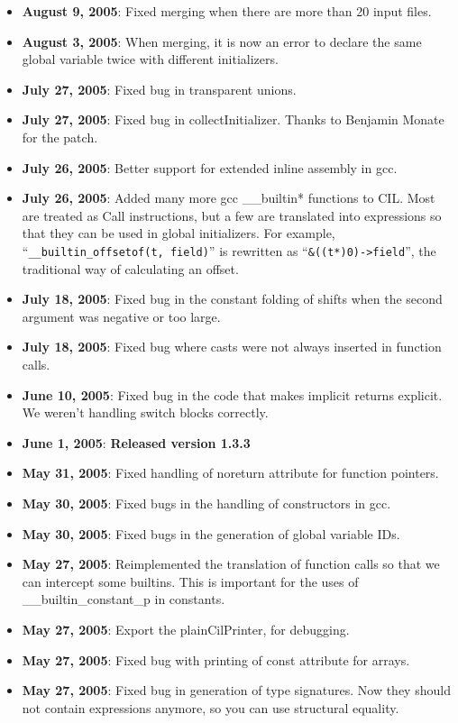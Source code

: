 \documentclass[letterpaper]{article}
\def\t#1{{\tt #1}}
\begin{document}
\begin{itemize}
\item {\bf August 9, 2005}: Fixed merging when there are more than 20
  input files.
\item {\bf August 3, 2005}: When merging, it is now an error to
  declare the same global variable twice with different initializers.
\item {\bf July 27, 2005}: Fixed bug in transparent unions.
\item {\bf July 27, 2005}: Fixed bug in collectInitializer.  Thanks to
  Benjamin Monate for the patch.
\item {\bf July 26, 2005}: Better support for extended inline assembly
  in gcc.
\item {\bf July 26, 2005}: Added many more gcc \_\_builtin* functions
  to CIL.  Most are treated as Call instructions, but a few are
  translated into expressions so that they can be used in global
  initializers.  For example, ``\t{\_\_builtin\_offsetof(t, field)}'' is
  rewritten as ``\t{\&((t*)0)->field}'', the traditional way of calculating
  an offset.
\item {\bf July 18, 2005}: Fixed bug in the constant folding of shifts
  when the second argument was negative or too large.
\item {\bf July 18, 2005}: Fixed bug where casts were not always
  inserted in function calls.
\item {\bf June 10, 2005}: Fixed bug in the code that makes implicit
  returns explicit.  We weren't handling switch blocks correctly.
\item {\bf June 1, 2005}: {\bf Released version 1.3.3}
\item {\bf May 31, 2005}: Fixed handling of noreturn attribute for function
  pointers. 
\item {\bf May 30, 2005}: Fixed bugs in the handling of constructors in gcc.
\item {\bf May 30, 2005}: Fixed bugs in the generation of global variable IDs.
\item {\bf May 27, 2005}: Reimplemented the translation of function calls so
  that we can intercept some builtins. This is important for the uses of
  \_\_builtin\_constant\_p in constants. 
\item {\bf May 27, 2005}: Export the plainCilPrinter, for debugging.
\item {\bf May 27, 2005}: Fixed bug with printing of const attribute for
  arrays. 
\item {\bf May 27, 2005}: Fixed bug in generation of type signatures. Now they
  should not contain expressions anymore, so you can use structural equality.

\end{itemize}
\end{document}
